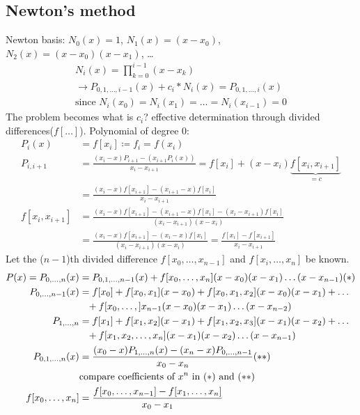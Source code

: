\subsection{Newton's method}\label{subsec:newton's-method}
Newton basis: $N_0 (x) = 1$, $N_1(x) =(x-x_0)$, $N_2(x)=(x-x_0)(x-x_1)$, \ldots
\begin{align*}
    N_i(x)=\prod_{k=0}^{i-1}(x-x_k)\\
    \to P_{0,1,\ldots, i-1}(x)+c_i * N_i(x) = P_{0,1,\ldots, i}(x)\\
    \text{since } N_i(x_0)=N_i(x_1)=\ldots=N_i(x_{i-1})=0
\end{align*}
The problem becomes what is $c_i$?
effective determination through divided differences($f[\ldots]$). Polynomial of degree 0:
\begin{align*}
    P_i(x) &= f[x_i] \coloneqq f_i = f(x_i)\\
    P_{i, i+1} &= \frac{(x_i - x) P_{i+1}-(x_{i+1} P_i(x))}{x_i-x_{i+1}} =f[x_i]+(x-x_i)\underbrace{f[x_i, x_{i+1}]}_{=c}\\
    &=\frac{(x_i-x)f[x_{i+1}]-(x_{i+1}-x) f[x_i]}{x_i-x_{i+1}}\\
    f[x_i, x_{i+1}] &= \frac{(x_i-x)f[x_{i+1}]-(x_{i+1}-x) f[x_i]-(x_i-x_{i+1}) f[x_i]}{(x_i-x_{i+1})(x-x_i)}\\
    &= \frac{(x_i-x)f[x_{i+1}]-(x_i-x)f[x_i]}{(x_i-x_{i+1})(x-x_i)}=\frac{f[x_i]-f[x_{i+1}]}{x_i-x_{i+1}}
\end{align*}
Let the ($n-1$)th divided difference $f[x_0, \ldots, x_{n-1}]$ and $f[x_i, \ldots, x_n]$ be known.
\begin{align*}
    P(x)=P_{0, \ldots, n}(x)&=P_{0,1,\ldots, n-1}(x)+f[x_0, \ldots, x_n](x-x_0)(x-x_1)\ldots(x-x_{n-1}) \text{(\textasteriskcentered{})}\\
    P_{0,\ldots, n-1}(x)&=f[x_0]+f[x_0, x_1](x-x_0)+f[x_0,x_1,x_2](x-x_0)(x-x_1)+
    \ldots\\
    &\phantom{=}+f[x_0,\ldots, ]x_{n-1}(x-x_0)(x-x_1)\ldots(x-x_{n-2})\\
    P_{1,\ldots, n} &= f[x_1] + f[x_1, x_2](x-x_1)+f[x_1, x_2, x_3](x-x_1)(x-x_2)+\ldots\\
    &\phantom{=}+f[x_1, x_2, \ldots, x_n] (x-x_1)(x-x_2)\ldots (x-x_{n-1})\\
    P_{0,1,\ldots, n}(x) &= \frac{(x_0-x)P_{1,\ldots, n}(x)-(x_n-x)P_{0,\ldots, n-1}}{x_0-x_n} \text{(\textasteriskcentered{}\textasteriskcentered{})}\\
    &\text{compare coefficients of $x^n$ in (\textasteriskcentered{}) and (\textasteriskcentered{}\textasteriskcentered{})}\\
    f[x_0,\ldots, x_n]&=\frac{f[x_0, \ldots, x_{n-1}]-f[x_1, \ldots, x_n]}{x_0-x_1}
\end{align*}
